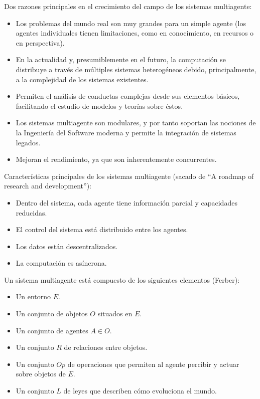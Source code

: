 Dos razones principales en el crecimiento del campo de los sistemas multiagente:

\begin{itemize}
	\item Los problemas del mundo real son muy grandes para un simple agente (los agentes individuales tienen limitaciones, como en conocimiento, en recursos o en perspectiva).
	\item En la actualidad y, presumiblemente en el futuro, la computación se distribuye a través de múltiples sistemas heterogéneos debido, principalmente, a la complejidad de los sistemas existentes.
	\item Permiten el análisis de conductas complejas desde sus elementos básicos, facilitando el estudio de modelos y teorías sobre éstos.
	\item Los sistemas multiagente son modulares, y por tanto soportan las nociones de la Ingeniería del Software moderna y permite la integración de sistemas legados.
	\item Mejoran el rendimiento, ya que son inherentemente concurrentes.
\end{itemize}

Características principales de los sistemas multiagente (sacado de \enquote{A roadmap of research and development}):

\begin{itemize}
	\item Dentro del sistema, cada agente tiene información parcial y capacidades reducidas.
	\item El control del sistema está distribuido entre los agentes.
	\item Los datos están descentralizados.
	\item La computación es asíncrona.
\end{itemize}

Un sistema multiagente está compuesto de los siguientes elementos (Ferber):

\begin{itemize}
	\item Un entorno $E$.
	\item Un conjunto de objetos $O$ situados en $E$.
	\item Un conjunto de agentes $A \in O$.
	\item Un conjunto $R$ de relaciones entre objetos.
	\item Un conjunto $Op$ de operaciones que permiten al agente percibir y actuar sobre objetos de $E$.
	\item Un conjunto $L$ de leyes que describen cómo evoluciona el mundo.
\end{itemize}